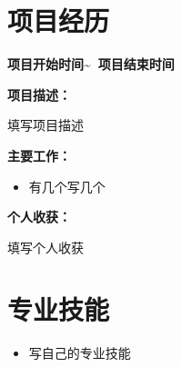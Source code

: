 \documentclass[UTF8,AutoFakeBold]{resume}
\begin{document}
\section{\hspace{0.25em}\makebox[0.75em][c]{\faFlask} \fangsong\textbf{项目经历}}
{\textbf{项目开始时间\textasciitilde \ 项目结束时间}}
    \raggedright\textbf{项目描述：}
    \begin{description}[style=unboxed, leftmargin=0pt, noitemsep, nolistsep]
    \item\kaishu  填写项目描述
    \end{description}
    \raggedright\textbf{主要工作：}
    \begin{itemize}
        \item\kaishu 有几个写几个
    \end{itemize}
    \raggedright\textbf{个人收获：}
     \begin{description}[style=unboxed, leftmargin=0pt, noitemsep, nolistsep]
    \item\kaishu 填写个人收获
    \end{description}
\section{\hspace{0.25em}\makebox[0.75em][c]{\faPuzzlePiece} \fangsong\textbf{专业技能}}
\noindent
    \begin{itemize}
        \item\kaishu 写自己的专业技能
    \end{itemize}
\end{document}
